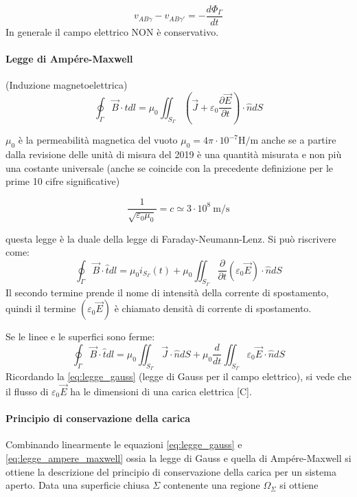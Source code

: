 $$
v_{AB\gamma} - v_{AB\gamma'} = -\frac{d\Phi_\Gamma}{dt}
$$
In generale il campo elettrico NON è conservativo.

\paragraph{Legge di Ampére-Maxwell} (Induzione magnetoelettrica)
\begin{equation}
\label{eq:legge_ampere_maxwell}
\oint_\Gamma \vec{B}\cdot\hat{t} dl = \mu_0 \iint_{S_\Gamma} \left(\vec{J} + \varepsilon_0\frac{\partial\vec{E}}{\partial t}\right)\cdot \hat{n} dS
\end{equation}

$\mu_0$ è la permeabilità magnetica del vuoto $\mu_0 = 4\pi\cdot10^{-7}\si{\henry\per\meter} $
anche se a partire dalla revisione delle unità di misura del 2019 è una quantità misurata e non più una costante universale (anche se coincide con la precedente definizione per le prime 10 cifre significative)

$$
\frac{1}{\sqrt{\varepsilon_0\mu_0}} = c \simeq 3\cdot10^{8}\ \si{\meter\per\second}
$$

questa legge è la duale della legge di Faraday-Neumann-Lenz. Si può riscrivere come:
$$
\oint_\Gamma\vec{B}\cdot\hat{t}dl = \mu_0 i_{S_\Gamma}(t) + \mu_0 \iint_{S_\Gamma} \frac{\partial}{\partial t}(\varepsilon_0 \vec{E})\cdot\hat{n}dS
$$
Il secondo termine prende il nome di intensità della corrente di spostamento, quindi il termine
$\left(\varepsilon_0 \vec{E}\right)$ è chiamato densità di corrente di spostamento.

Se le linee e le superfici sono ferme:
$$
\oint_\Gamma\vec{B}\cdot\hat{t}dl = \mu_0\iint_{S_\Gamma}\vec{J}\cdot\hat{n}dS + 
\mu_0\frac{d}{dt}\iint_{S_\Gamma} \varepsilon_0 \vec{E}\cdot\hat{n} dS
$$
Ricordando la \ref{eq:legge_gauss} (legge di Gauss per il campo elettrico), 
si vede che il flusso di $\varepsilon_0\vec{E}$ ha le dimensioni di una carica elettrica 
[\si{\coulomb}].


\paragraph{Principio di conservazione della carica}
Combinando linearmente le equazioni \ref{eq:legge_gauss} e \ref{eq:legge_ampere_maxwell} ossia 
la legge di Gauss e quella di Ampére-Maxwell si ottiene la descrizione del principio di conservazione
della carica per un sistema aperto.
Data una superficie chiusa $\Sigma$ contenente una regione $\Omega_\Sigma$ si ottiene


